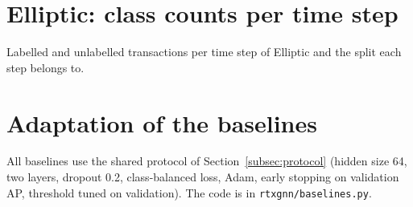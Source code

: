 \appendix

\section{Elliptic: class counts per time step}
\label{app:elliptic}

\begin{table}[!ht]
\centering
\caption{Labelled and unlabelled transactions per time step of Elliptic and the split each step belongs to.}
\label{tab:elliptic_steps}
\footnotesize
\setlength{\tabcolsep}{4pt}
\begin{adjustbox}{max width=\textwidth}\end{adjustbox}
\end{table}

\section{Adaptation of the baselines}
\label{app:baselines}

All baselines use the shared protocol of Section~\ref{subsec:protocol} (hidden size 64, two layers, dropout 0.2, class-balanced loss, Adam, early stopping on validation AP, threshold tuned on validation). The code is in \texttt{rtxgnn/baselines.py}.


